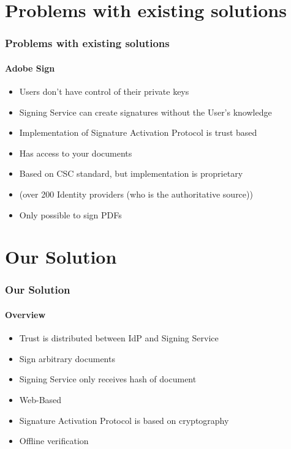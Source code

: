\section{Problems with existing solutions}
\sectionpage


\begin{frame}[t]\frametitle{Problems with existing solutions}
	\framesubtitle{Adobe Sign}
	\begin{itemize}
	  \item Users don't have control of their private keys
      \item Signing Service can create signatures without the User's knowledge
      \item Implementation of Signature Activation Protocol is trust based
      \item Has access to your documents
	  \item Based on CSC standard, but implementation is proprietary
	  \item (over 200 Identity providers (who is the authoritative source))
	  \item Only possible to sign PDFs
	\end{itemize}
\end{frame}


\section{Our Solution}
\sectionpage

\begin{frame}[t]\frametitle{Our Solution}
	\framesubtitle{Overview}
	\begin{itemize}
		\item Trust is distributed between IdP and Signing Service
		\item Sign arbitrary documents
		\item Signing Service only receives hash of document
		\item Web-Based
		\item Signature Activation Protocol is based on cryptography
		\item Offline verification
	\end{itemize}
\end{frame}

